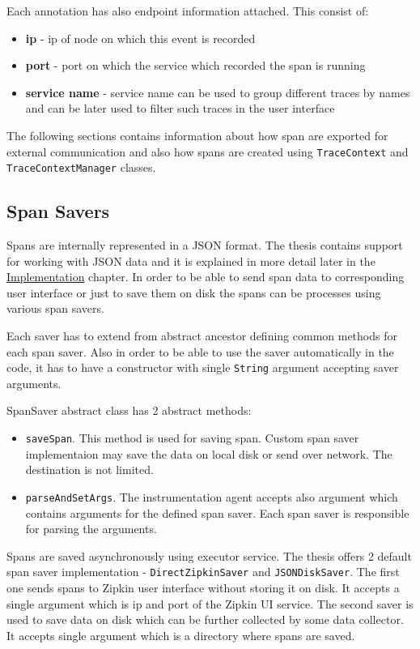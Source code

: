 Each annotation has also endpoint information attached. This consist of:
\begin{itemize}
	\item \textbf{ip} - ip of node on which this event is recorded
	\item \textbf{port} - port on which the service which recorded the span is running
	\item \textbf{service name} - service name can be used to group different traces by names and can be later used to filter such traces in the user interface
\end{itemize}

The following sections contains information about how span are exported for external communication and also how spans are created using \texttt{TraceContext} and \texttt{TraceContextManager} classes.
\subsection{Span Savers}
Spans are internally represented in a JSON format. The thesis contains support for working with JSON data and it is explained in more detail later in the  \hyperref[chap:implementation]{Implementation} chapter. In order to be able to send span data to corresponding user interface or just to save them on disk the spans can be processes using various span savers.

Each saver has to extend from abstract ancestor defining common methods for each span saver. Also in order to be able to use the saver automatically in the code, it has to have a constructor with single \texttt{String} argument accepting saver arguments.

SpanSaver abstract class has 2 abstract methods:
\begin{itemize}
	\item \texttt{saveSpan}. This method is used for saving span. Custom span saver implementaion may save the data on local disk or send over network. The destination is not limited.
	\item \texttt{parseAndSetArgs}. The instrumentation agent accepts also argument which contains arguments for the defined span saver. Each span saver is responsible for parsing the arguments.
\end{itemize}

Spans are saved asynchronously using executor service. The thesis offers 2 default span saver implementation - \texttt{DirectZipkinSaver} and \texttt{JSONDiskSaver}. The first one sends spans to Zipkin 
user interface without storing it on disk. It accepts a single argument which is ip and port of the Zipkin UI service. The second saver is used to save data on disk which can be further collected by some data collector. It accepts single argument which is a directory where spans are saved.

